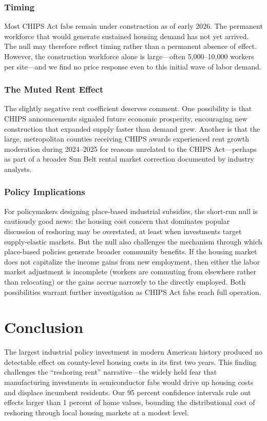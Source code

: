 \documentclass[12pt]{article}
\begin{document}
\subsubsection*{Timing} Most CHIPS Act fabs remain under construction as of early 2026. The permanent workforce that would generate sustained housing demand has not yet arrived. The null may therefore reflect timing rather than a permanent absence of effect. However, the construction workforce alone is large---often 5,000--10,000 workers per site---and we find no price response even to this initial wave of labor demand.

\subsubsection*{The Muted Rent Effect} The slightly negative rent coefficient deserves comment. One possibility is that CHIPS announcements signaled future economic prosperity, encouraging new construction that expanded supply faster than demand grew. Another is that the large, metropolitan counties receiving CHIPS awards experienced rent growth moderation during 2024--2025 for reasons unrelated to the CHIPS Act---perhaps as part of a broader Sun Belt rental market correction documented by industry analysts.

\subsubsection*{Policy Implications} For policymakers designing place-based industrial subsidies, the short-run null is cautiously good news: the housing cost concern that dominates popular discussion of reshoring may be overstated, at least when investments target supply-elastic markets. But the null also challenges the mechanism through which place-based policies generate broader community benefits. If the housing market does not capitalize the income gains from new employment, then either the labor market adjustment is incomplete (workers are commuting from elsewhere rather than relocating) or the gains accrue narrowly to the directly employed. Both possibilities warrant further investigation as CHIPS Act fabs reach full operation.

\section{Conclusion}

The largest industrial policy investment in modern American history produced no detectable effect on county-level housing costs in its first two years. This finding challenges the ``reshoring rent'' narrative---the widely held fear that manufacturing investments in semiconductor fabs would drive up housing costs and displace incumbent residents. Our 95 percent confidence intervals rule out effects larger than 1 percent of home values, bounding the distributional cost of reshoring through local housing markets at a modest level.
\end{document}
